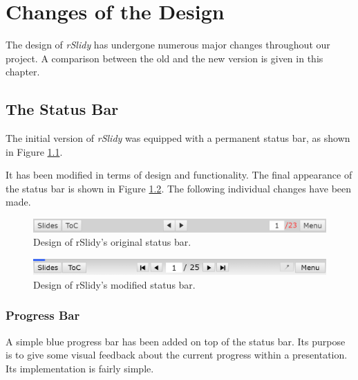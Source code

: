 %
%
% 
% 
% 


\chapter{Changes of the Design}

\label{chap:design}

The design of \textit{rSlidy} has undergone numerous major changes throughout our project. A comparison between the old and the new version is given in this chapter.

\section{The Status Bar}
The initial version of \textit{rSlidy} was equipped with a permanent status bar, as shown in Figure \ref{fig:statusbarOLD}.

It has been modified in terms of design and functionality. The final appearance of the status bar is shown in  Figure \ref{fig:statusbarNEW}. The following individual changes have been made.

\begin{figure}[tp]
	\centering
	\includegraphics[width = \textwidth]{images/status_bar_old.png}
	
	\caption[Original Status Bar]{
		Design of rSlidy's original status bar.
	}
	\label{fig:statusbarOLD}
\end{figure}

\begin{figure}[tp]
	\centering
	\includegraphics[width = \textwidth]{images/status_bar_new.png}
	
	\caption[Modified Status Bar]{
		Design of rSlidy's modified status bar.
	}
	\label{fig:statusbarNEW}
\end{figure}


\subsection{Progress Bar}
A simple blue progress bar has been added on top of the status bar. Its purpose is to give some visual feedback about the current progress within a presentation. Its implementation is fairly simple.

